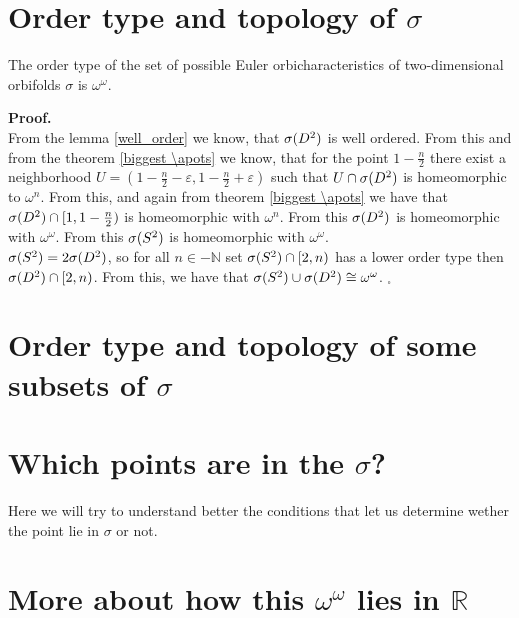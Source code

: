 \section{Order type and topology of $\sigma$}
\begin{theorem}
The order type of the set of possible Euler orbicharacteristics of two-dimensional orbifolds 
$\sigma$ is $\omega^\omega$. 
\end{theorem}
\noindent\textbf{Proof.} \\
From the lemma \ref{well_order} we know, that ${\mathcal{\sigma}(D^2)}$ is well ordered. From this and 
from the theorem \ref{biggest \apots} we know, that for the point $1-\frac{n}{2}$ there exist 
a neighborhood $U=(1-\frac{n}{2}-\varepsilon,1-\frac{n}{2}+\varepsilon)$ such that $U \cap 
{\mathcal{\sigma}(D^2)}$ is homeomorphic to $\omega^n$. From this, and again from theorem \ref{biggest \apots} 
we have that ${\mathcal{\sigma}(D^2)} \cap [1,1-\frac{n}{2})$ is homeomorphic with $\omega^n$. 
From this ${\mathcal{\sigma}(D^2)}$ is homeomorphic with $\omega^\omega$. From this ${\mathcal{\sigma}(S^2)}$ is homeomorphic 
with $\omega^\omega$. \\
${\mathcal{\sigma}(S^2)} = 2{\mathcal{\sigma}(D^2)}$, so for all $n\in -\mathbb{N}$ set ${\mathcal{\sigma}(S^2)} \cap [2,n)$ has a lower order type then 
${\mathcal{\sigma}(D^2)}\cap [2,n)$. From this, we have that ${\mathcal{\sigma}(S^2)} \cup {\mathcal{\sigma}(D^2)} \cong \omega^\omega$. $_\square$ \\[4pt]

\section{Order type and topology of some subsets of $\sigma$}

\section{Which points are in the $\sigma$?}
Here we will try to understand better the conditions that let us determine wether the point 
lie in $\sigma$ or not.



\section{More about how this $\omega^\omega$ lies in $\mathbb{R}$}


